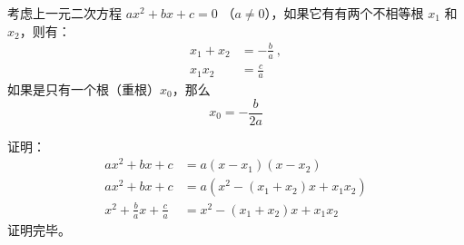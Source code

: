 
\begin{theorem}{}
考虑上一元二次方程 $a x^2 + b x + c = 0$ （$a \neq 0$），如果它有有两个不相等根 $x_1$ 和 $x_2$，则有：
$$\begin{aligned}
x_1 + x_2 &= -\frac{b}{a} ~,\\
x_1 x_2 &= \frac{c}{a}
\end{aligned}$$
如果是只有一个根（重根）$x_0$，那么
$$
x_0 = - \frac{b}{2 a}
$$
\end{theorem}

证明：
$$\begin{aligned}
a x^2 + b x + c &= a (x - x_1) (x - x_2) \\
a x^2 + b x + c &= a (x^2 - (x_1 + x_2) x + x_1 x_2) \\
x^2 + \frac{b}{a} x + \frac{c}{a} &=  x^2 - (x_1 + x_2) x + x_1 x_2
\end{aligned}$$
证明完毕。